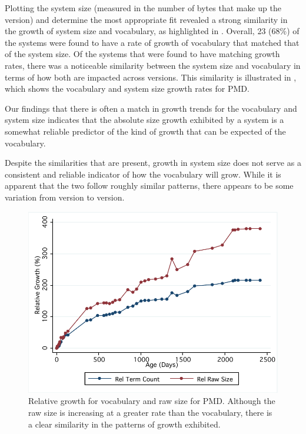 Plotting the system size (measured in the number of bytes that make up the version) and determine the most appropriate fit revealed a strong similarity in the growth of system size and vocabulary, as highlighted in . Overall, 23 (68\%) of the systems were found to have a rate of growth of vocabulary that matched that of the system size. Of the systems that were found to have matching growth rates, there was a noticeable similarity between the system size and vocabulary in terms of how both are impacted across versions. This similarity is illustrated in , which shows the vocabulary and system size growth rates for PMD.

Our findings that there is often a match in growth trends for the vocabulary and system size indicates that the absolute size growth exhibited by a system is a somewhat reliable predictor of the kind of growth that can be expected of the vocabulary.

Despite the similarities that are present, growth in system size does not serve as a consistent and reliable indicator of how the vocabulary will grow. While it is apparent that the two follow roughly similar patterns, there appears to be some variation from version to version.

\begin{figure}[t]
\centering
\includegraphics[width=\textwidth]{Figures/Vocab-PMDComparativeGrowth.pdf}
\caption{Relative growth for vocabulary and raw size for PMD. Although the raw size is increasing at a greater rate than the vocabulary, there is a clear similarity in the patterns of growth exhibited.}
\label{fig:comparative_growth_pmd}
\end{figure}

